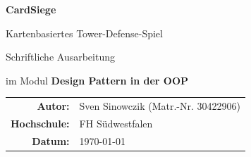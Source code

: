 \documentclass[a4paper,12pt]{article}
\begin{document}

\begin{titlepage}
    \centering
    \vspace*{2cm}
    {\Huge\bfseries CardSiege\par}
    \vspace{0.5cm}
    {\Large Kartenbasiertes Tower-Defense-Spiel\par}

    \vspace{2cm}
    {\large Schriftliche Ausarbeitung\par}
    \vspace{0.3cm}
    {\large im Modul \textbf{Design Pattern in der OOP}\par}
    \vspace{2cm}
    \begin{tabular}{rl}
        \textbf{Autor:}    & Sven Sinowczik (Matr.-Nr. 30422906) \\

        \textbf{Hochschule:} & FH Südwestfalen \\[0.5em]
        \textbf{Datum:}      & \today \\
    \end{tabular}
    \vfill
\end{titlepage}

\clearpage
{}
\tableofcontents
\newpage


\newpage

\newpage

\newpage

\newpage

\newpage

\end{document}
